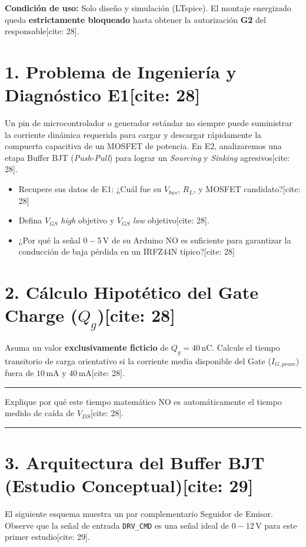 \documentclass[11pt, a4paper]{article}
\begin{document}
\begin{tcolorbox}[colback=ucbblue!5, colframe=ucbblue, title=\textbf{IMT-221 — Guía de Diseño E2: Buffer BJT Push-Pull (Estudiantes)[cite: 28]}]
    \textbf{Condición de uso:} Solo diseño y simulación (LTspice). El montaje energizado queda \textbf{estrictamente bloqueado} hasta obtener la autorización \textbf{G2} del responsable[cite: 28].
\end{tcolorbox}

\section*{1. Problema de Ingeniería y Diagnóstico E1[cite: 28]}
Un pin de microcontrolador o generador estándar no siempre puede suministrar la corriente dinámica requerida para cargar y descargar rápidamente la compuerta capacitiva de un MOSFET de potencia. En E2, analizaremos una etapa Buffer BJT (\textit{Push-Pull}) para lograr un \textit{Sourcing} y \textit{Sinking} agresivos[cite: 28].
\begin{itemize}
    \item Recupere sus datos de E1: ¿Cuál fue su $V_{bus}$, $R_L$, y MOSFET candidato?[cite: 28] \hrulefill
    \item Defina $V_{GS}$ \textit{high} objetivo y $V_{GS}$ \textit{low} objetivo[cite: 28]. \hrulefill
    \item ¿Por qué la señal $0-5\,\text{V}$ de su Arduino NO es suficiente para garantizar la conducción de baja pérdida en un IRFZ44N típico?[cite: 28] \hrulefill
\end{itemize}

\section*{2. Cálculo Hipotético del Gate Charge ($Q_g$)[cite: 28]}
Asuma un valor \textbf{exclusivamente ficticio} de $Q_g = 40\,\text{nC}$. Calcule el tiempo transitorio de carga orientativo si la corriente media disponible del Gate ($I_{G,prom}$) fuera de $10\,\text{mA}$ y $40\,\text{mA}$[cite: 28]. 
\par\vspace{0.2cm}\noindent\rule{\linewidth}{0.15mm}
Explique por qué este tiempo matemático NO es automáticamente el tiempo medido de caída de $V_{DS}$[cite: 28]. 
\par\vspace{0.2cm}\noindent\rule{\linewidth}{0.15mm}

\section*{3. Arquitectura del Buffer BJT (Estudio Conceptual)[cite: 29]}
El siguiente esquema muestra un par complementario Seguidor de Emisor. Observe que la señal de entrada \texttt{DRV\_CMD} es una señal ideal de $0-12\,\text{V}$ para este primer estudio[cite: 29]. 
\end{document}
